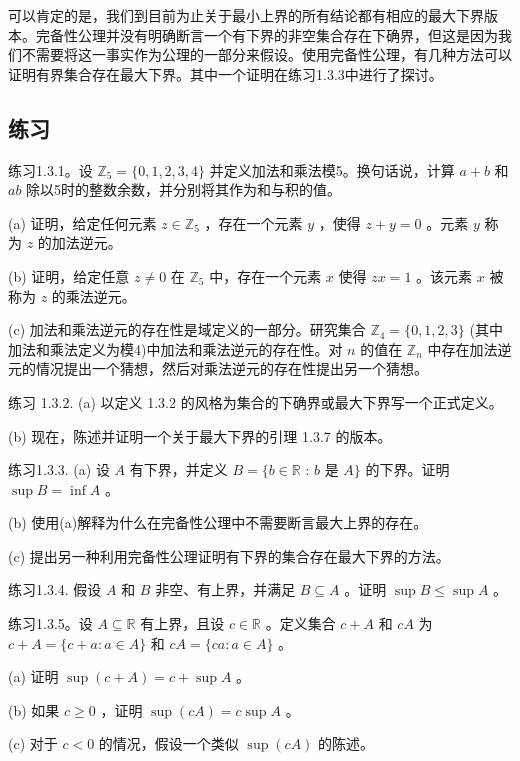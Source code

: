 可以肯定的是，我们到目前为止关于最小上界的所有结论都有相应的最大下界版本。完备性公理并没有明确断言一个有下界的非空集合存在下确界，但这是因为我们不需要将这一事实作为公理的一部分来假设。使用完备性公理，有几种方法可以证明有界集合存在最大下界。其中一个证明在练习1.3.3中进行了探讨。

\subsection{练习}

练习1.3.1。设 \({\mathbb{Z}}_{5} = \{ 0,1,2,3,4\}\) 并定义加法和乘法模5。换句话说，计算 \(a + b\) 和 \({ab}\) 除以5时的整数余数，并分别将其作为和与积的值。

(a) 证明，给定任何元素 \(z \in  {\mathbb{Z}}_{5}\) ，存在一个元素 \(y\) ，使得 \(z + y = 0\) 。元素 \(y\) 称为 \(z\) 的加法逆元。

(b) 证明，给定任意 \(z \neq  0\) 在 \({\mathbb{Z}}_{5}\) 中，存在一个元素 \(x\) 使得 \({zx} = 1\) 。该元素 \(x\) 被称为 \(z\) 的乘法逆元。

(c) 加法和乘法逆元的存在性是域定义的一部分。研究集合 \({\mathbb{Z}}_{4} = \{ 0,1,2,3\}\) (其中加法和乘法定义为模4)中加法和乘法逆元的存在性。对 \(n\) 的值在 \({\mathbb{Z}}_{n}\) 中存在加法逆元的情况提出一个猜想，然后对乘法逆元的存在性提出另一个猜想。

练习 1.3.2. (a) 以定义 1.3.2 的风格为集合的下确界或最大下界写一个正式定义。

(b) 现在，陈述并证明一个关于最大下界的引理 1.3.7 的版本。

练习1.3.3. (a) 设 \(A\) 有下界，并定义 \(B = \{ b \in  \mathbb{R}\) : \(b\) 是 \(A\}\) 的下界。证明 \(\sup B = \inf A\) 。

(b) 使用(a)解释为什么在完备性公理中不需要断言最大上界的存在。

(c) 提出另一种利用完备性公理证明有下界的集合存在最大下界的方法。

练习1.3.4. 假设 \(A\) 和 \(B\) 非空、有上界，并满足 \(B \subseteq  A\) 。证明 \(\sup B \leq  \sup A\) 。

练习1.3.5。设 \(A \subseteq  \mathbb{R}\) 有上界，且设 \(c \in  \mathbb{R}\) 。定义集合 \(c + A\) 和 \({cA}\) 为 \(c + A = \{ c + a : a \in  A\}\) 和 \({cA} = \{ {ca} : a \in  A\}\) 。

(a) 证明 \(\sup \left( {c + A}\right)  = c + \sup A\) 。

(b) 如果 \(c \geq  0\) ，证明 \(\sup \left( {cA}\right)  = c\sup A\) 。

(c) 对于 \(c < 0\) 的情况，假设一个类似 \(\sup \left( {cA}\right)\) 的陈述。

